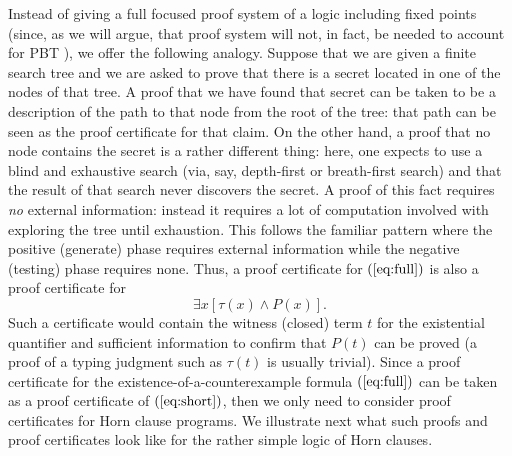 Instead of giving a full focused proof system of a logic including
fixed points (since, as we will argue, that proof system will not, in
fact, be needed to account for PBT ), we offer the following analogy.
%
Suppose that we are given a finite search tree and we are asked to
prove that there is a secret located in one of the nodes of that
tree.
%
A proof that we have found that secret can be taken to be a
description of the path to that node from the root of the tree: that
path can be seen as the proof certificate for that claim.
%
On the other hand, a proof that no node contains the secret is a
rather different thing: here, one expects to use a blind and
exhaustive search (via, say, depth-first or breath-first search) and
that the result of that search never discovers the secret.
%
A proof of this fact requires \emph{no} external information: instead it
requires a lot of computation involved with exploring the tree until
exhaustion.
%
This follows the familiar pattern where the positive (generate) phase
requires external information while the negative (testing) phase
requires none.
%
Thus, a proof certificate for $(\ref{eq:full})$ is also a proof
certificate for 
\[
  \exists x [\tau(x)\wedge P(x)].
  \tag{**}\label{eq:short}
\]
Such a certificate would contain the witness (closed) term $t$ for the
existential quantifier and sufficient information to confirm that
$P(t)$ can be proved (a proof of a typing judgment such as $\tau(t)$
is usually trivial).
%
Since a proof certificate for the existence-of-a-counterexample formula
$(\ref{eq:full})$ can be taken as a proof certificate of
$(\ref{eq:short})$, then we only need to consider proof certificates
for Horn clause programs.
%
We illustrate next what such proofs and proof certificates look like
for the rather simple logic of Horn clauses.


